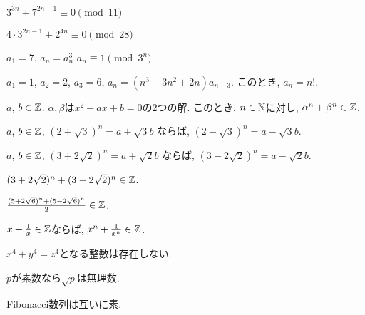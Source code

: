 \begin{prop}
  $3^{3n}+7^{2n-1}\equiv 0\pmod{11}$
\end{prop}

\begin{prop}
  $4\cdot 3^{2n-1}+2^{4n}\equiv 0\pmod{28}$
\end{prop}

\begin{prop}
  $a_1=7$, $a_{n}=a_{n}^3$
  $a_n\equiv 1\pmod{3^n}$
\end{prop}

\begin{prop}
  $a_1=1$, $a_2=2$, $a_3=6$,
  $a_n=(n^3-3n^2+2n)a_{n-3}$.
  このとき, $a_n=n!$.
\end{prop}



\begin{prop}
  $a$, $b\in\mathbb{Z}$.
  $\alpha, \beta$は$x^2-ax+b=0$の2つの解.
  このとき, $n\in\mathbb{N}$に対し,
  $\alpha^n+\beta^n\in \mathbb{Z}$.
\end{prop}

\begin{prop}
  $a$, $b\in\mathbb{Z}$,  
  $(2+\sqrt{3})^n=a+\sqrt{3}b$
  ならば,
  $(2-\sqrt{3})^n=a-\sqrt{3}b$.
\end{prop}

\begin{prop}
  $a$, $b\in\mathbb{Z}$,  
  $(3+2\sqrt{2})^n=a+\sqrt{2}b$
  ならば,
  $(3-2\sqrt{2})^n=a-\sqrt{2}b$.
\end{prop}


\begin{prop}
  $(3+2\sqrt{2})^n+(3-2\sqrt{2})^n\in\mathbb{Z}$.
\end{prop}

\begin{prop}
  $\frac{(5+2\sqrt{6})^n+(5-2\sqrt{6})^n}{2}\in\mathbb{Z}$.
\end{prop}

\begin{prop}
  $x+\frac{1}{x}\in\mathbb{Z}$ならば, 
  $x^n+\frac{1}{x^n}\in\mathbb{Z}$.
\end{prop}


\begin{prop}
  $x^4+y^4=z^4$となる整数は存在しない.
\end{prop}

\begin{prop}
  $p$が素数なら$\sqrt{p}$は無理数.
\end{prop}

\begin{prop}
  Fibonacci数列は互いに素.
\end{prop}



